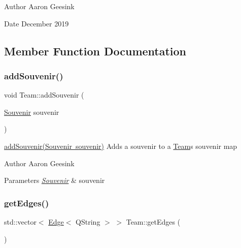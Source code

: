\begin{DoxyAuthor}{Author}
Aaron Geesink 
\end{DoxyAuthor}
\begin{DoxyDate}{Date}
December 2019 
\end{DoxyDate}


\subsection{Member Function Documentation}
\mbox{\label{class_team_a5d516800cd065c65222caf75ab3f5286}} 
\subsubsection{\texorpdfstring{addSouvenir()}{addSouvenir()}}
{\footnotesize\ttfamily void Team\+::add\+Souvenir (\begin{DoxyParamCaption}\item[{\mbox{\hyperlink{class_souvenir}{Souvenir}}}]{souvenir }\end{DoxyParamCaption})}



\mbox{\hyperlink{class_team_a5d516800cd065c65222caf75ab3f5286}{add\+Souvenir(\+Souvenir souvenir)}} Adds a souvenir to a \mbox{\hyperlink{class_team}{Team}}\textquotesingle{}s souvenir map 

\begin{DoxyAuthor}{Author}
Aaron Geesink 
\end{DoxyAuthor}

\begin{DoxyParams}{Parameters}
{\em \mbox{\hyperlink{class_souvenir}{Souvenir}}} & souvenir \\
\hline
\end{DoxyParams}
\mbox{\label{class_team_a04db74ce13bfe7c9d9fdf133920b5d72}} 
\subsubsection{\texorpdfstring{getEdges()}{getEdges()}}
{\footnotesize\ttfamily std\+::vector$<$ \mbox{\hyperlink{struct_edge}{Edge}}$<$ Q\+String $>$ $>$ Team\+::get\+Edges (\begin{DoxyParamCaption}{ }\end{DoxyParamCaption})}



